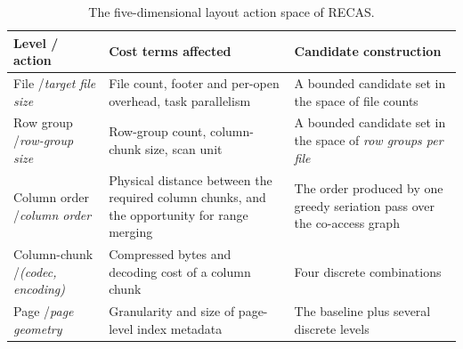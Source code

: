 \begin{table}[t]
\centering
\footnotesize
\caption{The five-dimensional layout action space of RECAS.}
\label{tab:action-space}

\begin{tabularx}{\columnwidth}{@{}
  >{\raggedright\arraybackslash}p{}
  >{\raggedright\arraybackslash}p{}
  X
@{}}
\toprule
\textbf{Level / action} &
\textbf{Cost terms affected} &
\textbf{Candidate construction} \\
\midrule
File /\newline\textit{target file size} &
File count, footer and per-open overhead, task parallelism &
A bounded candidate set in the space of file counts \\
\addlinespace[3pt]
Row group /\newline\textit{row-group size} &
Row-group count, column-chunk size, scan unit &
A bounded candidate set in the space of \emph{row groups per file} \\
\addlinespace[3pt]
Column order /\newline\textit{column order} &
Physical distance between the required column chunks, and the opportunity for range merging &
The order produced by one greedy seriation pass over the co-access graph \\
\addlinespace[3pt]
Column-chunk /\newline\textit{(codec, encoding)} &
Compressed bytes and decoding cost of a column chunk &
Four discrete combinations \\
\addlinespace[3pt]
Page /\newline\textit{page geometry} &
Granularity and size of page-level index metadata &
The baseline plus several discrete levels \\
\bottomrule
\end{tabularx}
\end{table}

